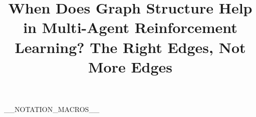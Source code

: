 \let\orcidlogo\relax
\usepackage{orcidlink}   %

\providecommand{\Description}[1]{}

__NOTATION_MACROS__

\raggedbottom




\title[When Does Graph Structure Help in MARL?]{When Does Graph Structure Help in Multi-Agent Reinforcement Learning? The Right Edges, Not More Edges}

\author*[1]{ }

\author[2]{ }


